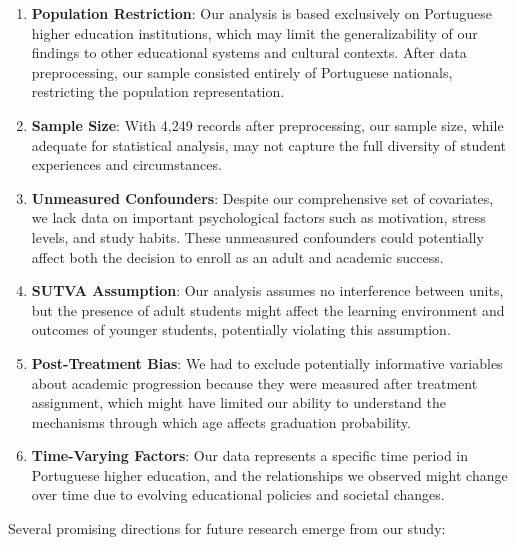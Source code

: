 \documentclass{article}
\begin{document}
\begin{enumerate}
    \item \textbf{Population Restriction}: Our analysis is based exclusively on Portuguese higher education institutions, which may limit the generalizability of our findings to other educational systems and cultural contexts. After data preprocessing, our sample consisted entirely of Portuguese nationals, restricting the population representation.

    \item \textbf{Sample Size}: With 4,249 records after preprocessing, our sample size, while adequate for statistical analysis, may not capture the full diversity of student experiences and circumstances.

    \item \textbf{Unmeasured Confounders}: Despite our comprehensive set of covariates, we lack data on important psychological factors such as motivation, stress levels, and study habits. These unmeasured confounders could potentially affect both the decision to enroll as an adult and academic success.

    \item \textbf{SUTVA Assumption}: Our analysis assumes no interference between units, but the presence of adult students might affect the learning environment and outcomes of younger students, potentially violating this assumption.

    \item \textbf{Post-Treatment Bias}: We had to exclude potentially informative variables about academic progression because they were measured after treatment assignment, which might have limited our ability to understand the mechanisms through which age affects graduation probability.

    \item \textbf{Time-Varying Factors}: Our data represents a specific time period in Portuguese higher education, and the relationships we observed might change over time due to evolving educational policies and societal changes.
\end{enumerate}

Several promising directions for future research emerge from our study:
\end{document}
